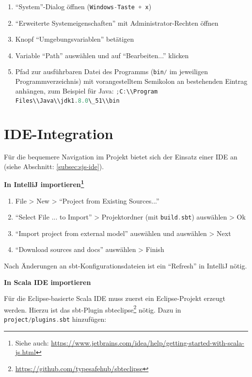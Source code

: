\documentclass[a4paper, 12pt, hidelinks, listof=totoc, listoftables=totoc, bibliography=totoc]{scrreprt}
\newcommand{\code}[1]{\lstinline[language=Scala, style=inline]|#1|}
\newcommand{\MyMiniSec}[1]{\rmfamily\fontsize{12}{15}\selectfont
	\vspace{7pt}\textbf{#1} %
}
\begin{document}
\begin{enumerate}
\item "`System"'-Dialog öffnen (\code{Windows-Taste + x})
\item "`Erweiterte Systemeigenschaften"' mit Administrator-Rechten öffnen
\item Knopf "`Umgebungsvariablen"' betätigen
\item Variable "`Path"' auswählen und auf "`Bearbeiten..."' klicken
\item Pfad zur ausführbaren Datei des Programms (\code{bin/} im jeweiligen Programmverzeichnis) mit vorangestelltem Semikolon an bestehenden Eintrag anhängen, zum Beispiel für Java: \code{;C:\\Program Files\\Java\\jdk1.8.0\_51\\bin}

\end{enumerate}


\section{IDE-Integration}

Für die bequemere Navigation im Projekt bietet sich der Einsatz einer \ac{IDE} an (siehe Abschnitt: \ref{subsec:sjs-ide}).


\MyMiniSec{In IntelliJ importieren\footnote{Siehe auch: \url{https://www.jetbrains.com/idea/help/getting-started-with-scala-js.html}}}

\begin{enumerate}
\item File  >  New  >  "`Project from Existing Sources..."'
\item "`Select File ... to Import"'  >  Projektordner (mit \code{build.sbt}) auswählen  >  Ok
\item "`Import project from external model"' auswählen und auswählen  >  Next
\item "`Download sources and docs"' auswählen  >  Finish
\end{enumerate}

Nach Änderungen an sbt-Konfigurationsdateien ist ein "`Refresh"' in IntelliJ nötig.



\MyMiniSec{In Scala IDE importieren}

Für die Eclipse-basierte Scala IDE muss zuerst ein Eclipse-Projekt erzeugt werden. Hierzu ist das sbt-Plugin sbteclipse\footnote{\url{https://github.com/typesafehub/sbteclipse}} nötig. Dazu in \code{project/plugins.sbt} hinzufügen:
\end{document}

